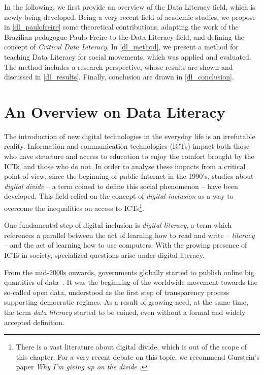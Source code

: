 In the following, we first provide an overview of the Data Literacy field, which is newly being developed.
Being a very recent field of academic studies, we propose in \autoref{dl_paulofreire} some theoretical contributions, adapting the work of the Brazilian pedagogue Paulo Freire to the Data Literacy field, and defining the concept of \emph{Critical Data Literacy}.
In \autoref{dl_method}, we present a method for teaching Data Literacy for social movements, which was applied and evaluated.
The method includes a research perspective, whose results are shown and discussed in \autoref{dl_results}.
Finally, conclusion are drawn in \autoref{dl_conclusion}.


\section{An Overview on Data Literacy}
\label{dl_overview} 

The introduction of new digital technologies in the everyday life is an irrefutable reality. 
Information and communication technologies (ICTs) impact both those who have structure and access to education to enjoy the comfort brought by the ICTs, and those who do not. In order to analyse these impacts from a critical point of view, since the beginning of public Internet in the 1990's, studies about \emph{digital divide} -- a term coined to define this social phenomenon -- have been developed. 
This field relied on the concept of \emph{digital inclusion} as a way to overcome the inequalities on access to ICTs\footnote{There is a vast literature about digital divide, which is out of the scope of this chapter. 
For a very recent debate on this topic, we recommend Gurstein's paper \emph{Why I'm giving up on the divide} \cite{Gurstein2015}.}.

One fundamental step of digital inclusion is \emph{digital literacy}, a term which references a parallel between the act of learning how to read and write – \emph{literacy} –  and the act of learning how to use computers. With the growing presence of ICTs in society, specialized questions arise under digital literacy. 

From the mid-2000s onwards, governments globally started to publish online big quantities of data~\cite{Chignard2013}. 
It was the beginning of the worldwide movement towards the so-called open data, understood as the first step of transparency process supporting democratic regimes. 
As a result of growing need, at the same time, the term \emph{data literacy} started to be coined, even without a formal and widely accepted definition. 

